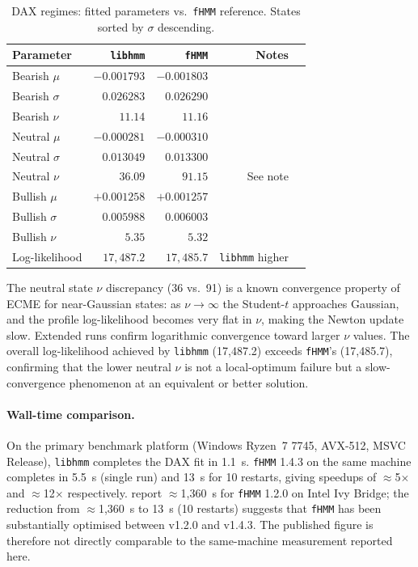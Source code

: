 \documentclass[11pt]{article}
\begin{document}
\begin{table}[!ht]
\centering
\caption{DAX regimes: fitted parameters vs.\ \texttt{fHMM} reference.
States sorted by $\sigma$ descending.}
\label{tab:dax}
\begin{tabular}{lrrrr}
\toprule
Parameter & \texttt{libhmm} & \texttt{fHMM} & Notes \\
\midrule
Bearish $\mu$     & $-0.001793$ & $-0.001803$ & \\
Bearish $\sigma$  & $0.026283$  & $0.026290$  & \\
Bearish $\nu$     & $11.14$     & $11.16$     & \\
Neutral $\mu$     & $-0.000281$ & $-0.000310$ & \\
Neutral $\sigma$  & $0.013049$  & $0.013300$  & \\
Neutral $\nu$     & $36.09$     & $91.15$     & See note \\
Bullish $\mu$     & $+0.001258$ & $+0.001257$ & \\
Bullish $\sigma$  & $0.005988$  & $0.006003$  & \\
Bullish $\nu$     & $5.35$      & $5.32$      & \\
Log-likelihood    & $17{,}487.2$ & $17{,}485.7$ & \texttt{libhmm} higher \\
\bottomrule
\end{tabular}
\end{table}

The neutral state $\nu$ discrepancy (36 vs.\ 91) is a known convergence
property of ECME for near-Gaussian states: as $\nu \to \infty$ the
Student-$t$ approaches Gaussian, and the profile log-likelihood becomes
very flat in $\nu$, making the Newton update slow.
Extended runs confirm logarithmic convergence toward larger $\nu$ values.
The overall log-likelihood achieved by \texttt{libhmm} (17,487.2) exceeds
\texttt{fHMM}'s (17,485.7), confirming that the lower neutral $\nu$ is not
a local-optimum failure but a slow-convergence phenomenon at an equivalent
or better solution.

\paragraph{Wall-time comparison.}
On the primary benchmark platform (Windows Ryzen~7 7745, AVX-512, MSVC Release),
\texttt{libhmm} completes the DAX fit in 1.1~s.
\texttt{fHMM} 1.4.3 on the same machine completes in 5.5~s (single run)
and 13~s for 10 restarts, giving speedups of $\approx$5$\times$ and
$\approx$12$\times$ respectively.
\citet{Oelschlager2024} report $\approx$1{,}360~s for \texttt{fHMM} 1.2.0
on Intel Ivy Bridge; the reduction from $\approx$1{,}360~s to 13~s (10 restarts)
suggests that \texttt{fHMM} has been substantially optimised between
v1.2.0 and v1.4.3.
The published figure is therefore not directly comparable to the same-machine
measurement reported here.
\end{document}
